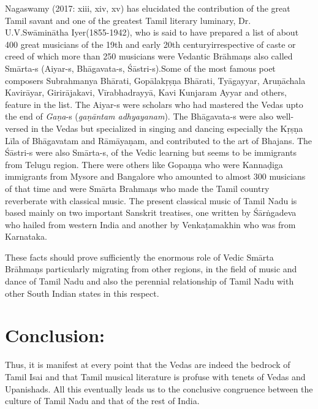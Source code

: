 Nagaswamy (2017: xiii, xiv, xv) has elucidated the contribution of the great Tamil savant and one of the greatest Tamil literary luminary, Dr. U.V.Swāminātha Iyer(1855-1942), who is said to have prepared a list of about 400 great musicians of the 19th and early 20th centuryirrespective of caste or creed of which more than 250 musicians were Vedantic Brāhmaṇs also called Smārta-s (Aiyar-s, Bhāgavata-s, Śāstri-s).Some of the most famous poet composers Subrahmanya Bhārati, Gopālakṛṣṇa Bhārati, Tyāgayyar, Aruṇāchala Kavirāyar, Girirājakavi, Vīrabhadrayyā, Kavi Kunjaram Ayyar and others, feature in the list. The Aiyar-s were scholars who had mastered the Vedas upto the end of \textit{Gaṇa}-s (\textit{gaṇāntam adhyayanam}). The Bhāgavata-s were also well-versed in the Vedas but specialized in singing and dancing especially the Kṛṣṇa Līla of Bhāgavatam and Rāmāyaṇam, and contributed to the art of Bhajans. The Śāstri-s were also Smārta-s, of the Vedic learning but seems to be immigrants from Telugu region. There were others like Gopaṇṇa who were Kannaḍiga immigrants from Mysore and Bangalore who amounted to almost 300 musicians of that time and were Smārta Brahmaṇs who made the Tamil country reverberate with classical music. The present classical music of Tamil Nadu is based mainly on two important Sanskrit treatises, one written by Śārṅgadeva who hailed from western India and another by Venkaṭamakhin who was from Karnataka.

These facts should prove sufficiently the enormous role of Vedic Smārta Brāhmaṇs particularly migrating from other regions, in the field of music and dance of Tamil Nadu and also the perennial relationship of Tamil Nadu with other South Indian states in this respect.


\section*{Conclusion:}

Thus, it is manifest at every point that the Vedas are indeed the bedrock of Tamil Isai and that Tamil musical literature is profuse with tenets of Vedas and Upanishads. All this eventually leads us to the conclusive congruence between the culture of Tamil Nadu and that of the rest of India.

